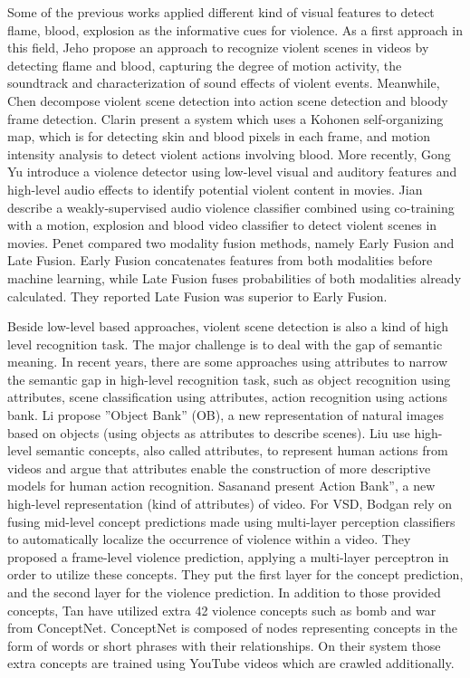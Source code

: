 \documentclass[review]{elsarticle}
\begin{document}
Some of the previous works applied different kind of visual features to detect flame, blood, explosion as the informative cues for violence. As a first approach in this field, Jeho \cite{nam1998audio} propose an approach to recognize violent scenes in videos by detecting flame and blood, capturing the degree of motion activity, the soundtrack and characterization of sound effects of violent events. Meanwhile, Chen \cite{2} decompose violent scene detection into action scene detection and bloody frame detection. Clarin \cite{3} present a system which uses a Kohonen self-organizing map, which is for detecting skin and blood pixels in each frame, and motion intensity analysis to detect violent actions involving blood. More recently, Gong Yu \cite{11} introduce a violence detector using low-level visual and auditory features and high-level audio effects to identify potential violent content in movies. Jian \cite{17} describe a weakly-supervised audio violence classifier combined using co-training with a motion, explosion and blood video classifier to detect violent scenes in movies. Penet \cite{21} compared two modality fusion methods, namely Early Fusion and Late Fusion. Early Fusion concatenates features from both modalities before machine learning, while Late Fusion fuses probabilities of both modalities already calculated. They reported Late Fusion was superior to Early Fusion.

Beside low-level based approaches, violent scene detection is also a kind of high level recognition task. The major challenge is to deal with the gap of semantic meaning. In recent years, there are some approaches using attributes to narrow the semantic gap in high-level recognition task, such as object recognition using attributes, scene classification using attributes, action recognition using actions bank\cite{23}. Li \cite{15} propose ”Object Bank” (OB), a new representation of natural images based on objects (using objects as attributes to describe scenes). Liu \cite{18} use high-level semantic concepts, also called attributes, to represent human actions from videos and argue that attributes enable the construction of more descriptive models for human action recognition. Sasanand \cite{23} present Action Bank”, a new high-level representation (kind of attributes) of video.  For VSD, Bodgan \cite{13} rely on fusing mid-level concept predictions made using multi-layer perception classifiers to automatically localize the occurrence of violence within a video.  They proposed a frame-level violence prediction, applying a multi-layer perceptron in order to utilize these concepts. They put the first layer for the concept prediction, and the second layer for the violence prediction. In addition to those provided concepts, Tan \cite{tan2013vireo} have utilized extra 42 violence concepts such as bomb and war from ConceptNet\cite{liu2004conceptnet}. ConceptNet is composed of nodes representing concepts in the form of words or short phrases with their relationships. On their system those extra concepts are trained using YouTube videos which are crawled additionally. 
\end{document}
